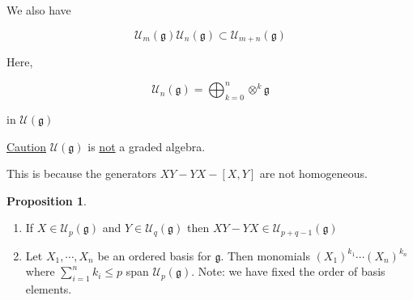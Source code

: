 \documentclass{article}
\theoremstyle{definition}
\newtheorem{proposition}{Proposition}
\begin{document}
We also have

\[
    \mathcal{U} _m(\mathfrak{g}) \mathcal{U}_n(\mathfrak{g}) \subset \mathcal{U}_{m + n}(\mathfrak{g})
\]

Here,

\[
    \mathcal{U}_n(\mathfrak{g}) = \bigoplus_{k=0}^n \otimes^k \mathfrak{g}
\]

in \(\mathcal{U} (\mathfrak{g})\) 

\underline{Caution} \(\mathcal{U} (\mathfrak{g})\) is \underline{not} a graded algebra.

This is because the generators \(XY - YX - [X,Y]\) are not homogeneous.

\begin{proposition}
    \begin{enumerate}
        \item If \(X\in \mathcal{U} _p(\mathfrak{g})\) and \(Y\in \mathcal{U} _  q(\mathfrak{g} )\) then \(XY - YX \in \mathcal{U}_{p+q-1}(\mathfrak{g})\)
        \item Let \(X_1,\cdots,X_n\) be an ordered basis for \(\mathfrak{g}\). Then monomials \((X_1)^{k_1}\cdots (X_n)^{k_n}\) where \(\sum_{i=1} ^n k_i \leq p\) span \(\mathcal{U} _p(\mathfrak{g})\). Note: we have fixed the order of basis elements.  
    \end{enumerate}

\end{proposition}
\end{document}
